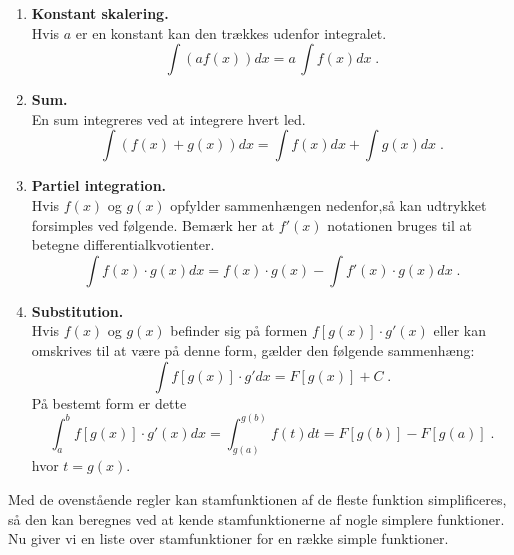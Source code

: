 \begin{enumerate}
	\item\label{itm:d-skalering} \textbf{Konstant skalering.}\\
	Hvis $a$ er en konstant kan den trækkes udenfor integralet.
	\[
	\int(af(x))dx = a \, \int f(x) dx \; .
	\]
	\item\label{itm:d-sum} \textbf{Sum.}\\
	En sum integreres ved at integrere hvert led.
	\[
	\int(f(x)+g(x))dx = \int f(x) dx + \int g(x) dx \; .
	\]
	\item\label{itm:d-produkt} \textbf{Partiel integration.}\\
	Hvis $f(x)$ og $g(x)$ opfylder sammenhængen nedenfor,så kan 
	udtrykket forsimples ved følgende. Bemærk her at $f'(x)$ 
	notationen bruges til at betegne differentialkvotienter.
	\[
	\int f(x)\cdot g(x) dx = f(x)\cdot g(x) - \int f'(x) \cdot g(x) dx  \; .
	\]
	\item\label{itm:d-kvotient} \textbf{Substitution.}\\
	Hvis $f(x)$ og $g(x)$ befinder sig på formen $f[g(x)]\cdot g'(x)$ 
	eller kan omskrives til at være på denne form, gælder den følgende
	sammenhæng:
	\[
	\int f[g(x)]\cdot g' dx = F[g(x)] + C \; .
	\]
	På bestemt form er dette
	\[
	\int_{a}^{b} f[g(x)]\cdot g'(x)dx = \int_{g(a)}^{g(b)} f(t) dt = F[g(b)]-F[g(a)] \; .
	\]
	hvor $t=g(x)$.
\end{enumerate}

Med de ovenstående regler kan stamfunktionen af de fleste
funktion simplificeres, så den kan beregnes ved at kende
stamfunktionerne af nogle simplere funktioner. Nu giver vi en
liste over stamfunktioner for en række simple funktioner.

